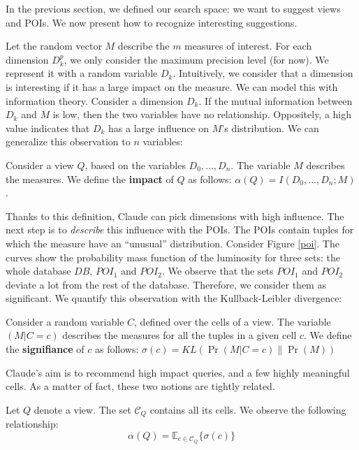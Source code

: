 In the previous section, we defined our search space: we want to suggest views
and POIs. We now present how to recognize interesting suggestions.

Let the random vector $M$ describe the $m$ measures of interest.  For each dimension
$D_k^p$, we only consider the maximum precision level (for now). We represent it with
a random variable $D_k$. Intuitively, we consider that a dimension is interesting if
it has a large impact on the measure. We can model this with information
theory. Consider a dimension $D_k$. If the mutual information between $D_k$ and
$M$ is low, then the two variables have no relationship.  Oppositely, a high
value indicates that $D_k$ has a large influence on $M$'s distribution.  We can
generalize this observation to $n$ variables:

\begin{definition}
Consider a view $Q$, based on the variables $D_0, \ldots, D_n$. The variable
$M$ describes the measures.  We define the \textbf{impact} of $Q$ as follows:
$\alpha(Q) = I(D_0, \ldots, D_n ; M)$.
\end{definition}

Thanks to this definition, Claude can pick dimensions with high influence.
The next step is to \emph{describe} this influence with the POIs. The POIs
contain tuples for which the measure have an ``unusual'' distribution.
Consider Figure \ref{poi}. The curves show the probability mass function of the
luminosity for three sets: the whole database $DB$, $POI_1$ and $POI_2$. We
observe that the sets $POI_1$ and $POI_2$ deviate a lot from the rest of the
database.  Therefore, we consider them as significant. We quantify this
observation with the Kullback-Leibler divergence:

\begin{definition}
Consider a random variable $C$, defined over the cells of a view.  The variable $(M |
C=c)$ describes the measures for all the tuples in a given cell $c$.  We define the
\textbf{signifiance} of $c$ as follows: $\sigma(c) = KL( \Pr(M | C=c) \|
\Pr(M)  )$
\end{definition}

Claude's aim is to recommend high impact queries, and a few highly meaningful
cells. As a matter of fact, these two notions are tightly related.

\begin{lemma}
Let $Q$ denote a view. The set $\mathcal{C}_Q$ contains all its cells. We
observe the following relationship:
\[
    \alpha(Q) = \mathbb{E}_{c \in \mathcal{C}_Q} \{ \sigma(c) \}
\]
\end{lemma}

